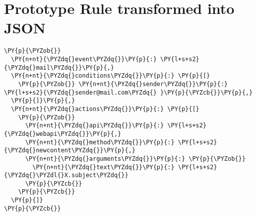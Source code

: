\section{Prototype Rule transformed into JSON}
\begin{Verbatim}[fontsize=\small,commandchars=\\\{\}]
\PY{p}{\PYZob{}}
  \PY{n+nt}{\PYZdq{}event\PYZdq{}}\PY{p}{:} \PY{l+s+s2}{\PYZdq{}mail\PYZdq{}}\PY{p}{,}
  \PY{n+nt}{\PYZdq{}conditions\PYZdq{}}\PY{p}{:} \PY{p}{[}
    \PY{p}{\PYZob{}} \PY{n+nt}{\PYZdq{}sender\PYZdq{}}\PY{p}{:} \PY{l+s+s2}{\PYZdq{}sender@mail.com\PYZdq{} }\PY{p}{\PYZcb{}}\PY{p}{,}
  \PY{p}{]}\PY{p}{,}
  \PY{n+nt}{\PYZdq{}actions\PYZdq{}}\PY{p}{:} \PY{p}{[}
    \PY{p}{\PYZob{}}
      \PY{n+nt}{\PYZdq{}api\PYZdq{}}\PY{p}{:} \PY{l+s+s2}{\PYZdq{}webapi\PYZdq{}}\PY{p}{,}
      \PY{n+nt}{\PYZdq{}method\PYZdq{}}\PY{p}{:} \PY{l+s+s2}{\PYZdq{}newcontent\PYZdq{}}\PY{p}{,}
      \PY{n+nt}{\PYZdq{}arguments\PYZdq{}}\PY{p}{:} \PY{p}{\PYZob{}}
        \PY{n+nt}{\PYZdq{}text\PYZdq{}}\PY{p}{:} \PY{l+s+s2}{\PYZdq{}\PYZdl{}X.subject\PYZdq{}}
      \PY{p}{\PYZcb{}}
    \PY{p}{\PYZcb{}}
  \PY{p}{]}
\PY{p}{\PYZcb{}}
\end{Verbatim}




